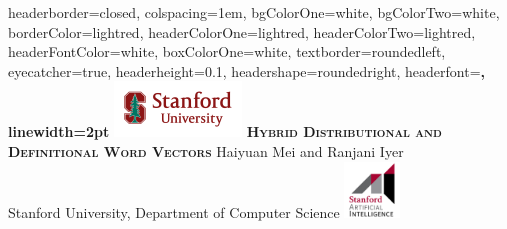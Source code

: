 \documentclass[landscape,a0paper,fontscale=0.285,table]{baposter} %
\begin{document}
\begin{poster}
{
headerborder=closed, %
colspacing=1em, %
bgColorOne=white, %
bgColorTwo=white, %
borderColor=lightred, %
headerColorOne=lightred, %
headerColorTwo=lightred, %
headerFontColor=white, %
boxColorOne=white, %
textborder=roundedleft, %
eyecatcher=true, %
headerheight=0.1\textheight, %
headershape=roundedright, %
headerfont=\Large\bf\textsc, %
linewidth=2pt %
}
%
{\includegraphics[height=4em]{imgs/logo1.png}} %
{\bf\textsc{Hybrid Distributional and Definitional Word Vectors}\vspace{0.05em}} %
{Haiyuan Mei and Ranjani Iyer\\
Stanford University, Department of Computer Science} %
{\includegraphics[height=4em]{imgs/logo2.jpg}} %



\end{poster}
\end{document}
